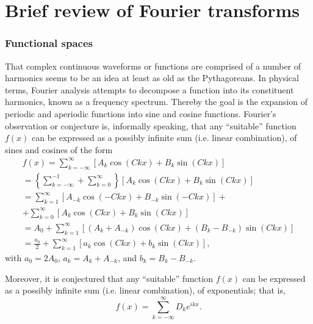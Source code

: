 \chapter{Brief review of Fourier transforms}

\subsection{Functional spaces}

That complex continuous waveforms or functions are comprised
of a number of harmonics seems to be an idea at least as old as the Pythagoreans.
In physical terms, Fourier analysis \cite{koerner,Howell,herman-fa}
attempts to decompose a function into its constituent harmonics, known as a frequency spectrum.
Thereby the goal is the expansion of periodic and aperiodic functions into sine and cosine functions.
Fourier's observation or conjecture is, informally speaking, that any   ``suitable''
function $f(x)$
can be expressed as a  possibly infinite  sum (i.e. linear combination), of sines
and cosines of the form
\begin{equation}
\begin{split}
f(x)
=
\sum_{k=-\infty}^\infty
\left[ A_k \cos (C k x) + B_k \sin (C k x)\right]\\
=
\left\{
\sum_{k=-\infty}^{-1} + \sum_{k=0}^\infty
\right\}
\left[ A_k \cos (C k x) + B_k \sin (C k x)\right]\\
=
\sum_{k=1}^{\infty}
\left[ A_{-k} \cos (-C k x) + B_{-k} \sin (-C k x)\right] +\qquad \qquad \\
+
\sum_{k=0}^\infty
\left[ A_k \cos (C k x) + B_k \sin (C k x)\right]\\
=
 A_0 +
\sum_{k=1}^{\infty}
\left[ \left( A_k+A_{-k} \right) \cos (C k x) + \left( B_k-B_{-k} \right) \sin (C k x)\right]
\\
=  \frac{a_0}{2} +
\sum_{k=1}^\infty
\left[ a_k  \cos (C k x) + b_k  \sin (C k x)\right]
,
\label{2012-m-ch-fourier_conjecture}
\end{split}
\end{equation}
with   $a_0=2 A_0$,
$a_k = A_k+ A_{-k}$,
and
$b_k = B_k- B_{-k}$.

Moreover, it is conjectured that any ``suitable''
function $f(x)$
can be expressed as a  possibly infinite  sum (i.e. linear combination), of exponentials; that is,
\begin{equation}
f(x)= \sum_{k=-\infty}^\infty
D_k e^{ikx}.
\label{2012-m-ch-fourier_conjecture1}
\end{equation}

